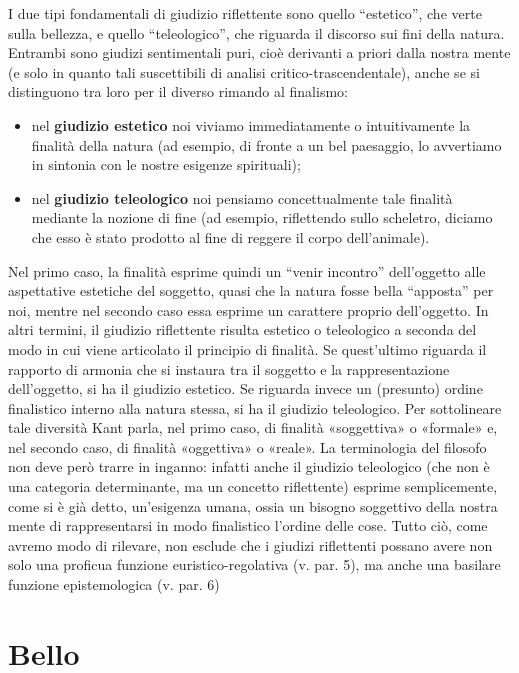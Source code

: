 \documentclass[a4paper, twoside, titlepage]{book}
\begin{document}
I due tipi fondamentali di giudizio riflettente sono quello “estetico”, che verte sulla bellezza, e quello “teleologico”, che riguarda il discorso sui fini della natura. Entrambi sono giudizi sentimentali puri, cioè derivanti a priori dalla nostra mente (e solo in quanto tali suscettibili di analisi critico-trascendentale), anche se si distinguono tra loro per il diverso rimando al finalismo:
\begin{itemize}
\item nel \textbf{giudizio estetico} noi viviamo immediatamente o intuitivamente la finalità della natura (ad esempio, di fronte a un bel paesaggio, lo avvertiamo in sintonia con le nostre esigenze spirituali);
\item nel \textbf{giudizio teleologico} noi pensiamo concettualmente tale finalità mediante la nozione di fine (ad esempio, riflettendo sullo scheletro, diciamo che esso è stato prodotto al fine di reggere il corpo dell’animale).
\end{itemize}

Nel primo caso, la finalità esprime quindi un “venir incontro” dell’oggetto alle aspettative estetiche del soggetto, quasi che la natura fosse bella “apposta” per noi, mentre nel secondo caso essa esprime un carattere proprio dell’oggetto. In altri termini, il giudizio riflettente risulta estetico o teleologico a seconda del modo in cui viene articolato il principio di finalità.
Se quest’ultimo riguarda il rapporto di armonia che si instaura tra il soggetto e la rappresentazione dell’oggetto, si ha il giudizio estetico. Se riguarda invece un (presunto) ordine finalistico interno alla natura stessa, si ha il giudizio teleologico. Per sottolineare tale diversità Kant parla, nel primo caso, di finalità «soggettiva» o «formale» e, nel secondo caso, di finalità «oggettiva» o «reale». La terminologia del filosofo non deve però trarre in inganno: infatti anche il giudizio teleologico (che non è una categoria determinante, ma un concetto riflettente) esprime semplicemente, come si è già detto, un’esigenza umana, ossia un bisogno soggettivo della nostra mente di rappresentarsi in modo finalistico l’ordine delle cose. Tutto ciò, come avremo modo di rilevare, non esclude che i giudizi riflettenti possano avere non solo una proficua funzione euristico-regolativa (v. par. 5), ma anche una basilare funzione epistemologica (v. par. 6)

\section{Bello}
\end{document}
